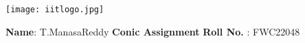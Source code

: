 \documentclass[10pt,a4paper]{report}
\begin{document}
\begin{figure*}[!tbp]
  \centering
  \begin{minipage}[b]{0.4\textwidth}
  \end{minipage}
  \hfill
  \vspace{5mm}\begin{minipage}[b]{0.4\textwidth}
\raggedleft  \texttt{[image: iitlogo.jpg]}  \

  \end{minipage}\vspace{0.2cm}
\end{figure*}
\raggedright \textbf{Name}:\hspace{1mm} T.ManasaReddy\hspace{3cm} \Large \textbf{Conic Assignment}\hspace{2.5cm} %
\normalsize \textbf{Roll No.} :\hspace{1mm} FWC22048\vspace{1cm}
\end{document}
